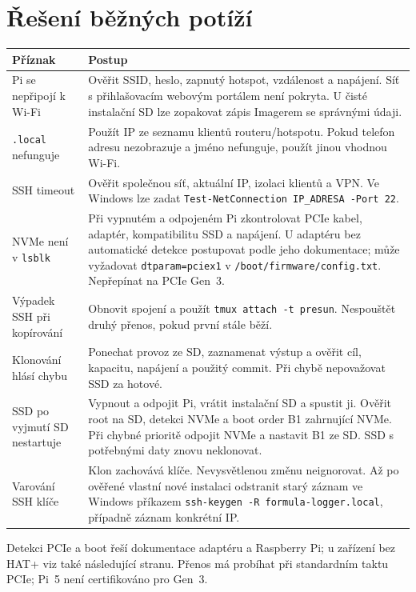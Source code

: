 \documentclass[11pt,a4paper]{article}
\newcounter{postup}
\begin{document}
\clearpage
\section{Řešení běžných potíží}
\begin{tabularx}{\textwidth}{L{39mm}Y}
\toprule Příznak & Postup\\\midrule
Pi se nepřipojí k Wi-Fi & Ověřit SSID, heslo, zapnutý hotspot, vzdálenost a napájení. Síť s přihlašovacím webovým portálem není pokryta. U čisté instalační SD lze zopakovat zápis Imagerem se správnými údaji.\\\addlinespace
\texttt{.local} nefunguje & Použít IP ze seznamu klientů routeru/hotspotu. Pokud telefon adresu nezobrazuje a jméno nefunguje, použít jinou vhodnou Wi-Fi.\\\addlinespace
SSH timeout & Ověřit společnou síť, aktuální IP, izolaci klientů a VPN. Ve Windows lze zadat \texttt{Test-NetConnection IP\_ADRESA -Port 22}.\\\addlinespace
NVMe není v \texttt{lsblk} & Při vypnutém a odpojeném Pi zkontrolovat PCIe kabel, adaptér, kompatibilitu SSD a napájení. U adaptéru bez automatické detekce postupovat podle jeho dokumentace; může vyžadovat \texttt{dtparam=pciex1} v \texttt{/boot/firmware/config.txt}. Nepřepínat na PCIe Gen~3.\\\addlinespace
Výpadek SSH při kopírování & Obnovit spojení a použít \texttt{tmux attach -t presun}. Nespouštět druhý přenos, pokud první stále běží.\\\addlinespace
Klonování hlásí chybu & Ponechat provoz ze SD, zaznamenat výstup a ověřit cíl, kapacitu, napájení a použitý commit. Při chybě nepovažovat SSD za hotové.\\\addlinespace
SSD po vyjmutí SD nestartuje & Vypnout a odpojit Pi, vrátit instalační SD a spustit ji. Ověřit root na SD, detekci NVMe a boot order B1 zahrnující NVMe. Při chybné prioritě odpojit NVMe a nastavit B1 ze SD. SSD s potřebnými daty znovu neklonovat.\\\addlinespace
Varování SSH klíče & Klon zachovává klíče. Nevysvětlenou změnu neignorovat. Až po ověřené vlastní nové instalaci odstranit starý záznam ve Windows příkazem \texttt{ssh-keygen -R formula-logger.local}, případně záznam konkrétní IP.\\
\bottomrule
\end{tabularx}
Detekci PCIe a boot řeší dokumentace adaptéru a Raspberry Pi; u zařízení bez HAT+ viz také následující stranu. Přenos má probíhat při standardním taktu PCIe; Pi~5 není certifikováno pro Gen~3.\cite{hat,nvme}
\end{document}
